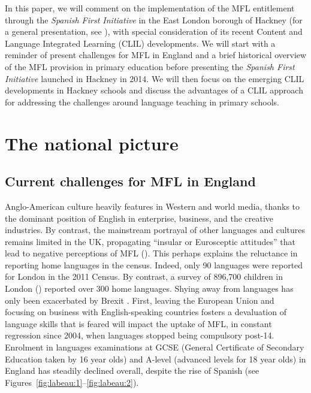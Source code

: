 \documentclass[output=paper]{langscibook}
\begin{document}
In this paper, we will comment on the implementation of the MFL entitlement through the \textit{Spanish First Initiative} in the East London borough of Hackney (for a general presentation, see \citealt{Baldwin2021}), with special consideration of its recent Content and Language Integrated Learning (CLIL) developments. We will start with a reminder of present challenges for MFL in England and a brief historical overview of the MFL provision in primary education before presenting the \textit{Spanish First Initiative} launched in Hackney in 2014. We will then focus on the emerging CLIL developments in Hackney schools and discuss the advantages of a CLIL approach for addressing the challenges around language teaching in primary schools. 

\section{The national picture}
\subsection{Current challenges for MFL in England}

Anglo-American culture heavily features in Western and world media, thanks to the dominant position of English in enterprise, business, and the creative industries. By contrast, the mainstream portrayal of other languages and cultures remains limited in the UK, propagating ``insular or Eurosceptic attitudes'' that lead to negative perceptions of MFL (\citealt[903]{TaylorMarsden2014}). This perhaps explains the reluctance in reporting home languages in the census. Indeed, only 90 languages were reported for London in the 2011 Census. By contrast, a survey of 896,700 children in London (\citealt{BakerEversley2000}) reported over 300 home languages. Shying away from languages has only been exacerbated by Brexit \citep{Adams2019}. First, leaving the European Union and focusing on business with English-speaking countries fosters a devaluation of language skills that is feared will impact the uptake of MFL, in constant regression since 2004, when languages stopped being compulsory post-14. Enrolment in languages examinations at GCSE (General Certificate of Secondary Education taken by 16 year olds) and A-level (advanced levels for 18 year olds) in England has steadily declined overall, despite the rise of Spanish (see Figures~\ref{fig:labeau:1}--\ref{fig:labeau:2}).
\end{document}
